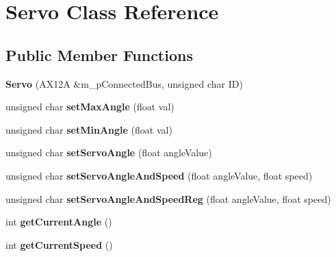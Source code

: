 \hypertarget{class_servo}{}\section{Servo Class Reference}
\label{class_servo}
\subsection*{Public Member Functions}
\begin{DoxyCompactItemize}
\item 
\mbox{\label{class_servo_affd2df4e8de8de0114398c04a4e6d6e0}} 
{\bfseries Servo} (A\+X12A \&m\+\_\+p\+Connected\+Bus, unsigned char ID)
\item 
\mbox{\label{class_servo_aff9741ce884a22efcaa6476005db74d4}} 
unsigned char {\bfseries set\+Max\+Angle} (float val)
\item 
\mbox{\label{class_servo_a3cc0174ac451eea0391a27d40b15deda}} 
unsigned char {\bfseries set\+Min\+Angle} (float val)
\item 
\mbox{\label{class_servo_ab0e99ff577c85efda55a4a44012e7e22}} 
unsigned char {\bfseries set\+Servo\+Angle} (float angle\+Value)
\item 
\mbox{\label{class_servo_a8ba146e7578f05ce76b13526eb9cf89c}} 
unsigned char {\bfseries set\+Servo\+Angle\+And\+Speed} (float angle\+Value, float speed)
\item 
\mbox{\label{class_servo_a52a01b9ab1aef5a18944d4d96d151510}} 
unsigned char {\bfseries set\+Servo\+Angle\+And\+Speed\+Reg} (float angle\+Value, float speed)
\item 
\mbox{\label{class_servo_aa5cf66024865204126dff3270fa94a45}} 
int {\bfseries get\+Current\+Angle} ()
\item 
\mbox{\label{class_servo_a0b23db9f7298f293b2a482af323754bd}} 
int {\bfseries get\+Current\+Speed} ()
\end{DoxyCompactItemize}
